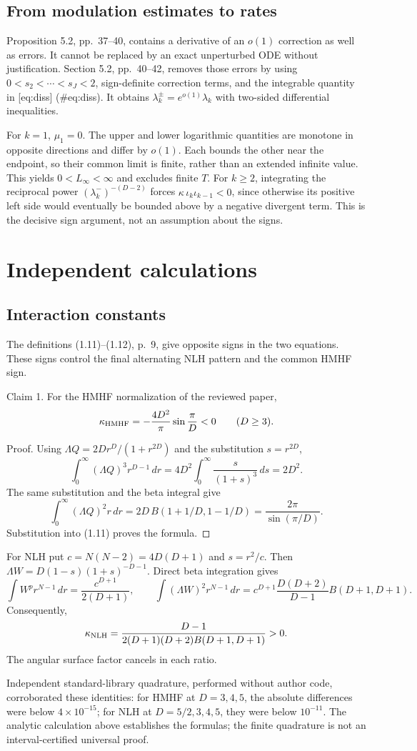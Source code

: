 \documentclass[10pt]{article}
\begin{document}
\subsection*{From modulation estimates to rates}
Proposition 5.2, pp. 37–40, contains a derivative of an \(o(1)\) correction as well as errors. It cannot be replaced by an exact unperturbed ODE without justification. Section 5.2, pp. 40–42, removes those errors by using \(0<s_2<\cdots<s_J<2\), sign-definite correction terms, and the integrable quantity in [eq:diss] (\#eq:diss). It obtains \(\lambda_k^\pm=e^{o(1)}\lambda_k\) with two-sided differential inequalities.\par
For \(k=1\), \(\mu_1=0\). The upper and lower logarithmic quantities are monotone in opposite directions and differ by \(o(1)\). Each bounds the other near the endpoint, so their common limit is finite, rather than an extended infinite value. This yields \(0<L_\infty<\infty\) and excludes finite \(T\). For \(k\geq2\), integrating the reciprocal power \((\lambda_k^-)^{-(D-2)}\) forces \(\kappa\,\iota_k\iota_{k-1}<0\), since otherwise its positive left side would eventually be bounded above by a negative divergent term. This is the decisive sign argument, not an assumption about the signs.\par
\section*{Independent calculations}
\subsection*{Interaction constants}
The definitions (1.11)–(1.12), p. 9, give opposite signs in the two equations. These signs control the final alternating NLH pattern and the common HMHF sign.\par
Claim 1.  For the HMHF normalization of the reviewed paper, \[\kappa_{\rm HMHF}=-\frac{4D^2}{\pi}\sin\frac{\pi}{D}<0
 \qquad(D\geq3).\]\par
Proof. Using \(\Lambda Q=2Dr^D/(1+r^{2D})\) and the substitution \(s=r^{2D}\), \[\int_0^\infty(\Lambda Q)^3r^{D-1}\,dr
 =4D^2\int_0^\infty\frac{s}{(1+s)^3}\,ds=2D^2.\] The same substitution and the beta integral give \[\int_0^\infty(\Lambda Q)^2r\,dr
 =2D\,B(1+1/D,1-1/D)=\frac{2\pi}{\sin(\pi/D)}.\] Substitution into (1.11) proves the formula. ◻\par
For NLH put \(c=N(N-2)=4D(D+1)\) and \(s=r^2/c\). Then \(\Lambda W=D(1-s)(1+s)^{-D-1}\). Direct beta integration gives \[\int W^pr^{N-1}\,dr=\frac{c^{D+1}}{2(D+1)},\qquad
 \int(\Lambda W)^2r^{N-1}\,dr
 =c^{D+1}\frac{D(D+2)}{D-1}B(D+1,D+1).\] Consequently, \[\kappa_{\rm NLH}=
 \frac{D-1}{2(D+1)(D+2)B(D+1,D+1)}>0.\] The angular surface factor cancels in each ratio.\par
Independent standard-library quadrature, performed without author code, corroborated these identities: for HMHF at \(D=3,4,5\), the absolute differences were below \(4\times10^{-15}\); for NLH at \(D=5/2,3,4,5\), they were below \(10^{-11}\). The analytic calculation above establishes the formulas; the finite quadrature is not an interval-certified universal proof.\par
\end{document}

